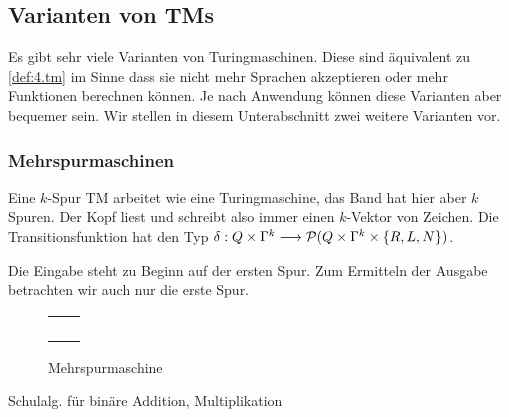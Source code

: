 \subsection{Varianten von \ac{TM}s}
Es gibt sehr viele Varianten von Turingmaschinen.
Diese sind äquivalent zu \autoref{def:4.tm} im Sinne dass sie nicht mehr Sprachen akzeptieren oder mehr Funktionen berechnen können.
Je nach Anwendung können diese Varianten aber bequemer sein. Wir stellen in diesem Unterabschnitt zwei weitere Varianten vor.


\subsubsection{Mehrspurmaschinen}

Eine $k$-Spur \ac{TM} arbeitet wie eine Turingmaschine, das Band hat hier aber $k$ Spuren.
Der Kopf liest und schreibt also immer einen $k$-Vektor von Zeichen.
Die Transitionsfunktion hat den Typ $\delta: Q\times\Gamma^k\--> \Powerset(Q\times\Gamma^k\times\{R,L,N\})$.

Die Eingabe steht zu Beginn auf der ersten Spur.
Zum Ermitteln der Ausgabe betrachten wir auch nur die erste Spur.

	\begin{figure}[H]\centering
		{\renewcommand{\arraystretch}{0.8}
		\begin{tabu} to .5\textwidth {X[.35]|X[.65]}
			&\\\hline
			&\\\hline
			&\\\hline
			&\\\hline
			&
		\end{tabu}}
		\caption{Mehrspurmaschine}
	\end{figure}

	\begin{Bsp*}
		Schulalg. für binäre Addition, Multiplikation
	\end{Bsp*}

